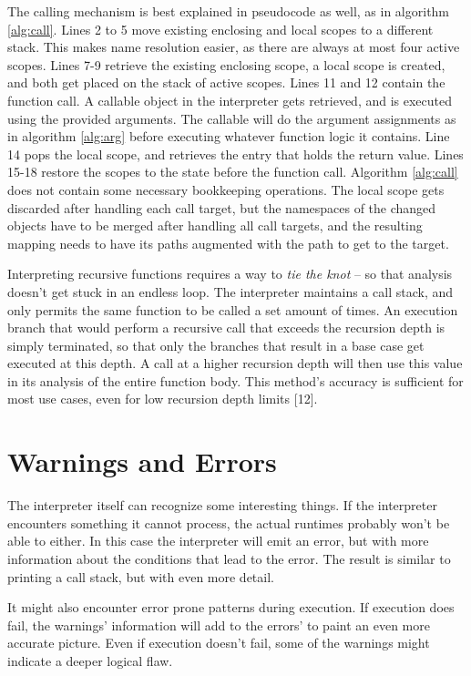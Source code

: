 \documentclass[a4paper, 16pt, oneside]{Thesis}
\begin{document}
The calling mechanism is best explained in pseudocode as well, as in
algorithm \ref{alg:call}. Lines 2 to 5 move existing enclosing and local
scopes to a different stack. This makes name resolution easier, as there
are always at most four active scopes. Lines 7-9 retrieve the existing
enclosing scope, a local scope is created, and both get placed on the
stack of active scopes. Lines 11 and 12 contain the function call. A
callable object in the interpreter gets retrieved, and is executed using
the provided arguments. The callable will do the argument assignments as
in algorithm \ref{alg:arg} before executing whatever function logic it
contains. Line 14 pops the local scope, and retrieves the entry that
holds the return value. Lines 15-18 restore the scopes to the state
before the function call. Algorithm \ref{alg:call} does not contain some
necessary bookkeeping operations. The local scope gets discarded after
handling each call target, but the namespaces of the changed objects
have to be merged after handling all call targets, and the resulting
mapping needs to have its paths augmented with the path to get to the
target.

Interpreting recursive functions requires a way to \emph{tie the knot}
-- so that analysis doesn't get stuck in an endless loop. The
interpreter maintains a call stack, and only permits the same function
to be called a set amount of times. An execution branch that would
perform a recursive call that exceeds the recursion depth is simply
terminated, so that only the branches that result in a base case get
executed at this depth. A call at a higher recursion depth will then use
this value in its analysis of the entire function body. This method's
accuracy is sufficient for most use cases, even for low recursion depth
limits {[}12{]}.

\section{Warnings and Errors}\label{warnings-and-errors}

The interpreter itself can recognize some interesting things. If the
interpreter encounters something it cannot process, the actual runtimes
probably won't be able to either. In this case the interpreter will emit
an error, but with more information about the conditions that lead to
the error. The result is similar to printing a call stack, but with even
more detail.

It might also encounter error prone patterns during execution. If
execution does fail, the warnings' information will add to the errors'
to paint an even more accurate picture. Even if execution doesn't fail,
some of the warnings might indicate a deeper logical flaw.
\end{document}
